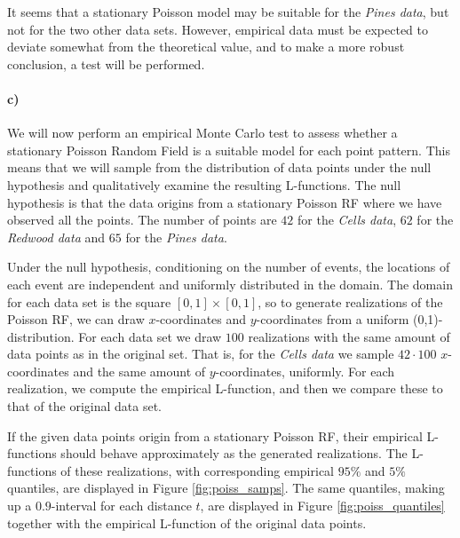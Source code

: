It seems that a stationary Poisson model may be suitable for the \textit{Pines data}, but not for the two other data sets. However, empirical data must be expected to deviate somewhat from the theoretical value, and to make a more robust conclusion, a test will be performed.

\paragraph{c)}
We will now perform an empirical Monte Carlo test to assess whether a stationary Poisson Random Field is a suitable model for each point pattern. This means that we will sample from the distribution of data points under the null hypothesis and qualitatively examine the resulting L-functions. The null hypothesis is that the data origins from a stationary Poisson RF where we have observed all the points. The number of points are $42$ for the \textit{Cells data}, $62$ for the \textit{Redwood data} and $65$ for the \textit{Pines data}.

Under the null hypothesis, conditioning on the number of events, the locations of each event are independent and uniformly distributed in the domain. The domain for each data set is the square $[0,1] \times [0,1]$, so to generate realizations of the Poisson RF, we can draw $x$-coordinates and $y$-coordinates from a uniform (0,1)-distribution. For each data set we draw $100$ realizations with the same amount of data points as in the original set. That is, for the \textit{Cells data} we sample $42\cdot 100$ $x$-coordinates and the same amount of $y$-coordinates, uniformly. For each realization, we compute the empirical L-function, and then we compare these to that of the original data set.

If the given data points origin from a stationary Poisson RF, their empirical L-functions should behave approximately as the generated realizations. The L-functions of these realizations, with corresponding empirical $95\%$ and $5\%$ quantiles, are displayed in Figure \ref{fig:poiss_samps}. The same quantiles, making up a $0.9$-interval for each distance $t$, are displayed in Figure \ref{fig:poiss_quantiles} together with the empirical L-function of the original data points.

